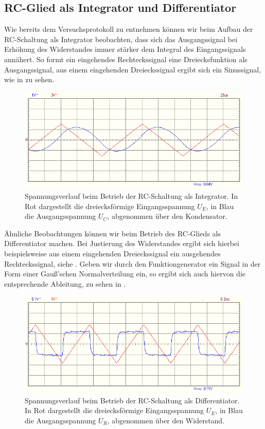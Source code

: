\subsection{RC-Glied als Integrator und Differentiator}

Wie bereits dem Versuchsprotokoll zu entnehmen können wir beim Aufbau der RC-Schaltung als Integrator beobachten, dass sich das Ausgangssignal bei Erhöhung des Widerstandes immer stärker dem Integral des Eingangssignals annähert. So formt ein eingehendes Rechteckssignal eine Dreiecksfunktion als Ausgangssignal, aus einem eingehenden Dreieckssignal ergibt sich ein Sinussignal, wie in  zu sehen.

\begin{figure}[H]
  \centering
  \includegraphics[width=.8\textwidth]{files/aufgabe2_integral_dreieck.png}
  \caption{Spannungsverlauf beim Betrieb der RC-Schaltung als Integrator. In Rot dargestellt die dreiecksförmige Eingangsspannung $U_E$, in Blau die Ausgangsspannung $U_C$, abgenommen über den Kondensator.}
  \label{fig:aufgabe2_integral_dreieck}
\end{figure}

Ähnliche Beobachtungen können wir beim Betrieb des RC-Glieds als Differentiator machen. Bei Justierung des Widerstandes ergibt sich hierbei beispielsweise aus einem eingehenden Dreieckssignal ein ausgehendes Rechteckssignal, siehe . Geben wir durch den Funktiongenerator ein Signal in der Form einer Gauß'schen Normalverteilung ein, so ergibt sich auch hiervon die entsprechende Ableitung, zu sehen in .


\begin{figure}[H]
  \centering
  \includegraphics[width=.8\textwidth]{files/aufgabe2_differentiator_dreieck.png}
  \caption{Spannungsverlauf beim Betrieb der RC-Schaltung als Differentiator. In Rot dargestellt die dreiecksförmige Eingangsspannung $U_E$, in Blau die Ausgangsspannung $U_R$, abgenommen über den Widerstand.}
  \label{fig:aufgabe2_differentiator_dreieck}
\end{figure}

